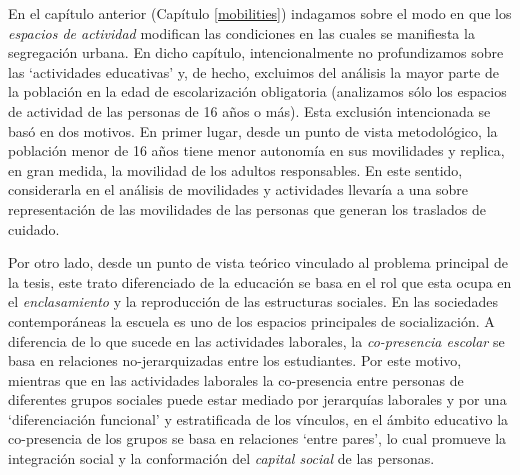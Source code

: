 \documentclass[
  spanish,
  a4paper,%
  chapterprefix=true,%
  DIV=calc,%
  twoside]{scrbook}%
\begin{document}
En el capítulo anterior (Capítulo \ref{mobilities}) indagamos sobre el
modo en que los \emph{espacios de actividad} modifican las condiciones en las
cuales se manifiesta la segregación urbana. En dicho capítulo,
intencionalmente no profundizamos sobre las `actividades educativas' y,
de hecho, excluimos del análisis la mayor parte de la población en la
edad de escolarización obligatoria (analizamos sólo los espacios de
actividad de las personas de 16 años o más). Esta exclusión intencionada
se basó en dos motivos. En primer lugar, desde un punto de vista
metodológico, la población menor de 16 años tiene menor autonomía en sus
movilidades y replica, en gran medida, la movilidad de los adultos
responsables. En este sentido, considerarla en el análisis de
movilidades y actividades llevaría a una sobre representación
de las movilidades de las personas que generan los
traslados de cuidado.

Por otro lado, desde un punto de vista teórico vinculado al problema
principal de la tesis, este trato diferenciado de la educación se basa
en el rol que esta ocupa en el \emph{enclasamiento} y la reproducción de las
estructuras sociales. En las sociedades contemporáneas la escuela es uno
de los espacios principales de socialización. A diferencia de lo que
sucede en las actividades laborales, la \emph{co-presencia escolar} se basa
en relaciones no-jerarquizadas entre los estudiantes. Por este motivo,
mientras que en las actividades laborales la co-presencia entre personas
de diferentes grupos sociales puede estar mediado por jerarquías
laborales y por una `diferenciación funcional' y estratificada de los
vínculos, en el ámbito educativo la co-presencia de los grupos se basa
en relaciones `entre pares', lo cual promueve la integración social y la
conformación del \emph{capital social} de las
personas.
\end{document}
